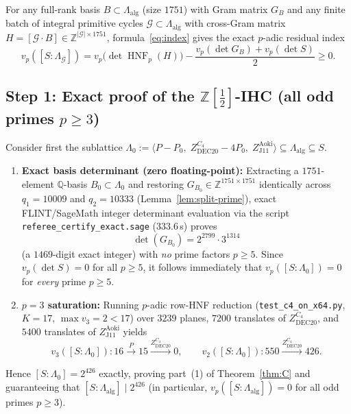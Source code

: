 \documentclass[11pt,a4paper]{amsart}
\theoremstyle{definition}
\newcommand{\ZZ}{\mathbb{Z}}
\newcommand{\QQ}{\mathbb{Q}}
\newcommand{\HNF}{\operatorname{HNF}}
\begin{document}
For any full-rank basis $B \subset \Lambda_{\mathrm{alg}}$ (size $1751$) with Gram matrix $G_B$ and any finite batch of integral primitive cycles $\mathcal{G} \subset \Lambda_{\mathrm{alg}}$ with cross-Gram matrix $H = [\mathcal{G} \cdot B] \in \ZZ^{|\mathcal{G}| \times 1751}$, formula~\eqref{eq:index} gives the exact $p$-adic residual index
\begin{equation}\label{eq:vp-index}
  v_p([S : \Lambda_{\mathcal{G}}]) = v_p\bigl(\det \HNF_p(H)\bigr) - \frac{v_p(\det G_B) + v_p(\det S)}{2} \ge 0.
\end{equation}

\subsection{Step 1: Exact proof of the \texorpdfstring{$\ZZ[\frac{1}{2}]$}{Z[1/2]}-IHC (all odd primes \texorpdfstring{$p \ge 3$}{p >= 3})}
Consider first the sublattice $\Lambda_0 := \langle P - P_0,\; Z_{\mathrm{DEC20}}^{C_4} - 4 P_0,\; Z_{\mathrm{J11}}^{\mathrm{Aoki}} \rangle \subseteq \Lambda_{\mathrm{alg}} \subseteq S$.
\begin{enumerate}
  \item \textbf{Exact basis determinant (zero floating-point):} Extracting a $1751$-element $\QQ$-basis $B_0 \subset \Lambda_0$ and restoring $G_{B_0} \in \ZZ^{1751 \times 1751}$ identically across $q_1 = 10009$ and $q_2 = 10333$ (Lemma~\ref{lem:split-prime}), exact FLINT/SageMath integer determinant evaluation via the script \texttt{referee\_certify\_exact.sage} ($333.6$\,s) proves
  \[
    \det(G_{B_0}) = 2^{2799} \cdot 3^{1314}
  \]
  (a $1469$-digit exact integer) with \emph{no} prime factors $p \ge 5$. Since $v_p(\det S) = 0$ for all $p \ge 5$, it follows immediately that $v_p([S : \Lambda_0]) = 0$ for \emph{every} prime $p \ge 5$.
  \item \textbf{$p = 3$ saturation:} Running $p$-adic row-HNF reduction (\texttt{test\_c4\_on\_x64.py}, $K = 17$, $\max v_3 = 2 < 17$) over $3239$ planes, $7200$ translates of $Z_{\mathrm{DEC20}}^{C_4}$, and $5400$ translates of $Z_{\mathrm{J11}}^{\mathrm{Aoki}}$ yields
  \[
    v_3([S : \Lambda_0]) : 16 \xrightarrow{P} 15 \xrightarrow{Z_{\mathrm{DEC20}}^{C_4}} 0, \qquad v_2([S : \Lambda_0]) : 550 \xrightarrow{Z_{\mathrm{DEC20}}^{C_4}} 426.
  \]
\end{enumerate}
Hence $[S : \Lambda_0] = 2^{426}$ exactly, proving part~(1) of Theorem~\ref{thm:C} and guaranteeing that $[S : \Lambda_{\mathrm{alg}}] \mid 2^{426}$ (in particular, $v_p([S : \Lambda_{\mathrm{alg}}]) = 0$ for all odd primes $p \ge 3$).
\end{document}
